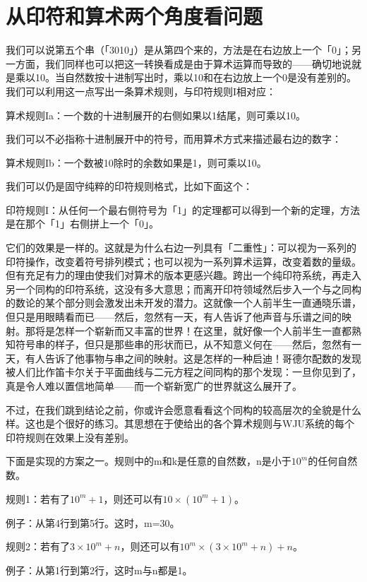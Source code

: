 \documentclass[
  12pt,
  twoside,
  openright,
  oldfontcommands,
]{memoir}
\begin{document}
\section{从印符和算术两个角度看问题}

我们可以说第五个串（「3010」）是从第四个来的，方法是在右边放上一个「0」；另一方面，我们同样也可以把这一转换看成是由于算术运算而导致的------确切地说就是乘以10。当自然数按十进制写出时，乘以10和在右边放上一个0是没有差别的。我们可以利用这一点写出一条算术规则，与印符规则I相对应：

算术规则Ia：一个数的十进制展开的右侧如果以1结尾，则可乘以10。

我们可以不必指称十进制展开中的符号，而用算术方式来描述最右边的数字：

算术规则Ib：一个数被10除时的余数如果是1，则可乘以10。

我们可以仍是固守纯粹的印符规则格式，比如下面这个：

印符规则I：从任何一个最右侧符号为「1」的定理都可以得到一个新的定理，方法是在那个「1」右侧拼上一个「0」。

它们的效果是一样的。这就是为什么右边一列具有「二重性」：可以视为一系列的印符操作，改变着符号排列模式；也可以视为一系列算术运算，改变着数的量级。但有充足有力的理由使我们对算术的版本更感兴趣。跨出一个纯印符系统，再走入另一个同构的印符系统，这没有多大意思；而离开印符领域然后步入一个与之同构的数论的某个部分则会激发出未开发的潜力。这就像一个人前半生一直通晓乐谱，但只是用眼睛看而已------然后，忽然有一天，有人告诉了他声音与乐谱之间的映射。那将是怎样一个崭新而又丰富的世界！在这里，就好像一个人前半生一直都熟知符号串的样子，但只是那些串的形状而已，从不知意义何在------然后，忽然有一天，有人告诉了他事物与串之间的映射。这是怎样的一种启迪！哥德尔配数的发现被人们比作笛卡尔关于平面曲线与二元方程之间同构的那个发现：一旦你见到了，真是令人难以置信地简单------而一个崭新宽广的世界就这么展开了。

不过，在我们跳到结论之前，你或许会愿意看看这个同构的较高层次的全貌是什么样。这也是个很好的练习。其思想在于使给出的各个算术规则与WJU系统的每个印符规则在效果上没有差别。

下面是实现的方案之一。规则中的m和k是任意的自然数，n是小于$10^m$的任何自然数。

规则1：若有了$10^m+1$，则还可以有$10\times(10^m+1)$。

例子：从第4行到第5行。这时，m=30。

规则2：若有了$3\times10^{m}+n$，则还可以有$10^{m}\times(3\times10^{m}+n)+n$。

例子：从第1行到第2行，这时m与n都是1。
\end{document}

